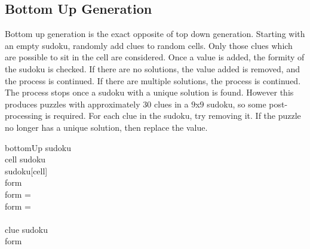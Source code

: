 \subsection{Bottom Up Generation}
Bottom up generation is the exact opposite of top down generation. Starting with an empty sudoku, randomly add clues
to random cells. Only those clues which are possible to sit in the cell are considered. Once a value is added, the formity
of the sudoku is checked. If there are no solutions, the value added is removed, and the process is continued. If there are
multiple solutions, the process is continued. The process stops once a sudoku with a unique solution is found. However this
produces puzzles with approximately $30$ clues in a $9$x$9$ sudoku, so some post-processing is required. For each clue in the
sudoku, try removing it. If the puzzle no longer has a unique solution, then replace the value.
\begin{center}
\begin{pseudocode}[framebox]{bottomUp}{ }
    sudoku \GETS {}                              \\
    \WHILE \TRUE \DO \BEGIN
        cell \GETS {} \in sudoku                    \\
        sudoku[cell] \GETS {}                   \\
        form \GETS {}                                 \\
        \IF form =  \THEN \EXIT \WHILE         \\
        \IF form =  \THEN {}    \\
    \END    \\
    \FOR clue \in sudoku \DO \BEGIN
                  \\
        \IF form \neq {} \THEN
    \END                                            \\
    \label{algo:bottomup}
\end{pseudocode}
\end{center}

